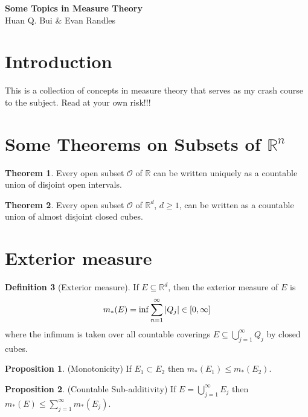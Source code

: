 \documentclass{article}
\theoremstyle{definition}
\newtheorem{prop}{Proposition}[section]
\theoremstyle{theorem}
\newtheorem{theorem}{Theorem}[section]
\newtheorem{definition}[theorem]{Definition}
\begin{document}
\begin{center}
	\textbf{Some Topics in Measure Theory}\\
	{Huan Q. Bui \& Evan Randles}\\
\end{center}


\section{Introduction}

This is a collection of concepts in measure theory that serves as my crash course to the subject. Read at your own risk!!!


\section{Some Theorems on Subsets of $\mathbb{R}^n$}

\begin{theorem}
Every open subset $\mathcal{O}$ of $\mathbb{R}$ can be written uniquely as a countable union of disjoint open intervals.
\end{theorem}


\begin{theorem}
Every open subset $\mathcal{O}$ of $\mathbb{R}^d$, $d\geq 1$, can be written as a countable union of almost disjoint closed cubes. 
\end{theorem}


\section{Exterior measure}

\begin{definition}[Exterior measure]
If $E \subseteq \mathbb{R}^d$, then the exterior measure of $E$ is 
\begin{equation*}
    m_*(E) = \inf \sum^\infty_{n=1}\abs{Q_j} \in [0,\infty]
\end{equation*}
where the infimum is taken over all countable coverings $E\subseteq \bigcup^\infty_{j=1} Q_j$ by closed cubes.
\end{definition}


\begin{prop}
(Monotonicity) If $E_1 \subset E_2$ then $m_*(E_1)\leq m_*(E_2)$.
\end{prop}

\begin{prop}
(Countable Sub-additivity) If $E = \bigcup^\infty_{j=1} E_j$ then $m_*(E) \leq \sum^\infty_{j=1} m_*(E_j)$.
\end{prop}
\end{document}

